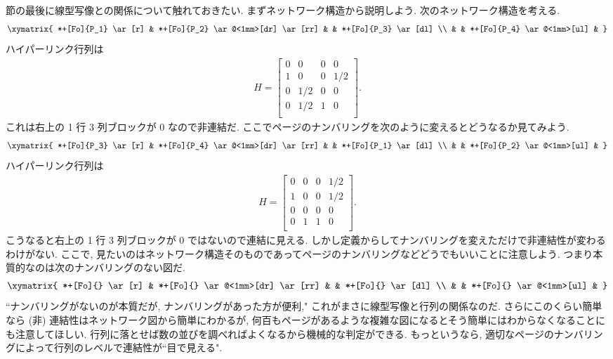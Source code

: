 \documentclass[openany, a4paper, oneside]{jsbook}
\begin{document}
{節の最後に線型写像との関係について触れておきたい.
まずネットワーク構造から説明しよう.
次のネットワーク構造を考える.
\begin{align}
 \xymatrix{
  *+[Fo]{P_1} \ar[r] & *+[Fo]{P_2} \ar@<1mm>[dr] \ar[rr] &                           & *+[Fo]{P_3} \ar[dl] \\
                     &                                   & *+[Fo]{P_4} \ar@<1mm>[ul] &
 }
\end{align}
ハイパーリンク行列は
\begin{align}
 H
 =
 \begin{bmatrix}
  0 & 0   & 0 & 0 \\
  1 & 0   & 0 & 1/2 \\
  0 & 1/2 & 0 & 0 \\
  0 & 1/2 & 1 & 0 \\
 \end{bmatrix}.
\end{align}
これは右上の 1 行 3 列ブロックが 0 なので非連結だ.
ここでページのナンバリングを次のように変えるとどうなるか見てみよう.
\begin{align}
 \xymatrix{
  *+[Fo]{P_3} \ar[r] & *+[Fo]{P_4} \ar@<1mm>[dr] \ar[rr] &                           & *+[Fo]{P_1} \ar[dl] \\
                     &                                   & *+[Fo]{P_2} \ar@<1mm>[ul] &
 }
\end{align}
ハイパーリンク行列は
\begin{align}
 H
 =
 \begin{bmatrix}
  0 & 0 & 0 & 1/2 \\
  1 & 0 & 0 & 1/2 \\
  0 & 0 & 0 & 0   \\
  0 & 1 & 1 & 0   \\
 \end{bmatrix}.
\end{align}
こうなると右上の 1 行 3 列ブロックが 0 ではないので連結に見える.
しかし定義からしてナンバリングを変えただけで非連結性が変わるわけがない.
ここで, 見たいのはネットワーク構造そのものであってページのナンバリングなどどうでもいいことに注意しよう.
つまり本質的なのは次のナンバリングのない図だ.
\begin{align}
 \xymatrix{
  *+[Fo]{} \ar[r] & *+[Fo]{} \ar@<1mm>[dr] \ar[rr] &                        & *+[Fo]{} \ar[dl] \\
                  &                                & *+[Fo]{} \ar@<1mm>[ul] &
 }
\end{align}
``ナンバリングがないのが本質だが, ナンバリングがあった方が便利," これがまさに線型写像と行列の関係なのだ.
さらにこのくらい簡単なら (非) 連結性はネットワーク図から簡単にわかるが,
何百もページがあるような複雑な図になるとそう簡単にはわからなくなることにも注意してほしい.
行列に落とせば数の並びを調べればよくなるから機械的な判定ができる.
もっというなら, 適切なページのナンバリングによって行列のレベルで連結性が``目で見える".

}
\end{document}
